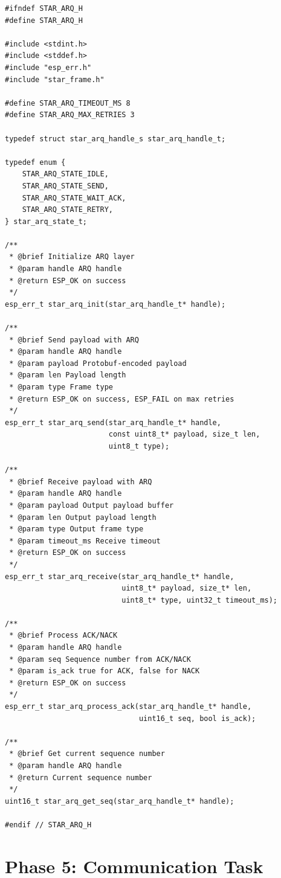 \documentclass[12pt,letterpaper]{article}
\begin{document}
\begin{lstlisting}[caption={star\_arq.h - ARQ Layer Interface}]
#ifndef STAR_ARQ_H
#define STAR_ARQ_H

#include <stdint.h>
#include <stddef.h>
#include "esp_err.h"
#include "star_frame.h"

#define STAR_ARQ_TIMEOUT_MS 8
#define STAR_ARQ_MAX_RETRIES 3

typedef struct star_arq_handle_s star_arq_handle_t;

typedef enum {
    STAR_ARQ_STATE_IDLE,
    STAR_ARQ_STATE_SEND,
    STAR_ARQ_STATE_WAIT_ACK,
    STAR_ARQ_STATE_RETRY,
} star_arq_state_t;

/**
 * @brief Initialize ARQ layer
 * @param handle ARQ handle
 * @return ESP_OK on success
 */
esp_err_t star_arq_init(star_arq_handle_t* handle);

/**
 * @brief Send payload with ARQ
 * @param handle ARQ handle
 * @param payload Protobuf-encoded payload
 * @param len Payload length
 * @param type Frame type
 * @return ESP_OK on success, ESP_FAIL on max retries
 */
esp_err_t star_arq_send(star_arq_handle_t* handle,
                        const uint8_t* payload, size_t len,
                        uint8_t type);

/**
 * @brief Receive payload with ARQ
 * @param handle ARQ handle
 * @param payload Output payload buffer
 * @param len Output payload length
 * @param type Output frame type
 * @param timeout_ms Receive timeout
 * @return ESP_OK on success
 */
esp_err_t star_arq_receive(star_arq_handle_t* handle,
                           uint8_t* payload, size_t* len,
                           uint8_t* type, uint32_t timeout_ms);

/**
 * @brief Process ACK/NACK
 * @param handle ARQ handle
 * @param seq Sequence number from ACK/NACK
 * @param is_ack true for ACK, false for NACK
 * @return ESP_OK on success
 */
esp_err_t star_arq_process_ack(star_arq_handle_t* handle,
                               uint16_t seq, bool is_ack);

/**
 * @brief Get current sequence number
 * @param handle ARQ handle
 * @return Current sequence number
 */
uint16_t star_arq_get_seq(star_arq_handle_t* handle);

#endif // STAR_ARQ_H
\end{lstlisting}

\section{Phase 5: Communication Task}
\end{document}
